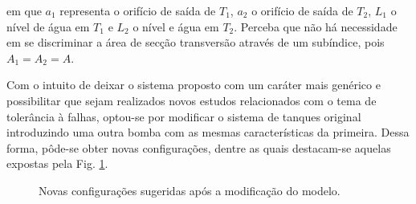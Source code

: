 \noindent em que $a_1$ representa o orifício de saída de $T_1$, $a_2$ o orifício
de saída de $T_2$, $L_1$ o nível de água em $T_1$ e $L_2$ o nível e água em
$T_2$. Perceba que não há necessidade em se discriminar a área de secção
transversão através de um subíndice, pois $A_1 = A_2 = A$.

Com o intuito de deixar o sistema proposto com um caráter mais genérico e
possibilitar que sejam realizados novos estudos relacionados com o tema de
tolerância à falhas, optou-se por modificar o sistema de tanques original
introduzindo uma outra bomba com as mesmas características da primeira. Dessa
forma, pôde-se obter novas configurações, dentre as quais destacam-se aquelas
expostas pela Fig. \ref{fig:novas_config}.

\begin{figure}[htb]
\centering
{}
\caption{Novas configurações sugeridas após a modificação do modelo.}
\label{fig:novas_config}
\end{figure}

